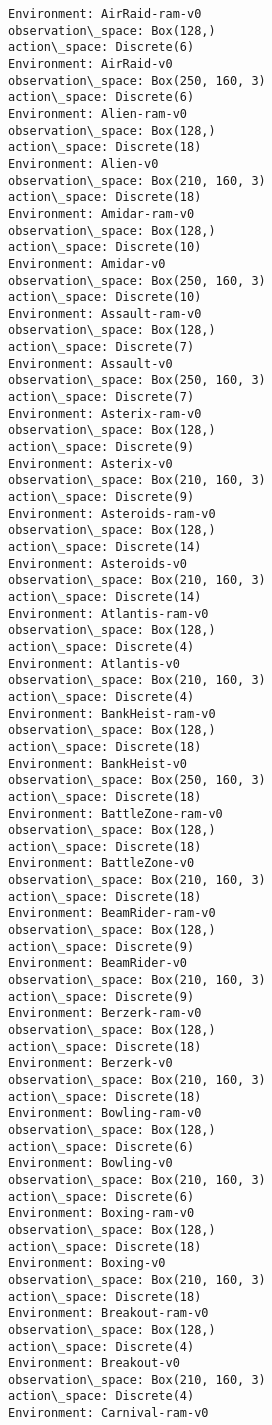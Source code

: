 \documentclass[11pt]{article}
\begin{document}
    \begin{Verbatim}[commandchars=\\\{\}]
Environment: AirRaid-ram-v0
observation\_space: Box(128,)
action\_space: Discrete(6)
Environment: AirRaid-v0
observation\_space: Box(250, 160, 3)
action\_space: Discrete(6)
Environment: Alien-ram-v0
observation\_space: Box(128,)
action\_space: Discrete(18)
Environment: Alien-v0
observation\_space: Box(210, 160, 3)
action\_space: Discrete(18)
Environment: Amidar-ram-v0
observation\_space: Box(128,)
action\_space: Discrete(10)
Environment: Amidar-v0
observation\_space: Box(250, 160, 3)
action\_space: Discrete(10)
Environment: Assault-ram-v0
observation\_space: Box(128,)
action\_space: Discrete(7)
Environment: Assault-v0
observation\_space: Box(250, 160, 3)
action\_space: Discrete(7)
Environment: Asterix-ram-v0
observation\_space: Box(128,)
action\_space: Discrete(9)
Environment: Asterix-v0
observation\_space: Box(210, 160, 3)
action\_space: Discrete(9)
Environment: Asteroids-ram-v0
observation\_space: Box(128,)
action\_space: Discrete(14)
Environment: Asteroids-v0
observation\_space: Box(210, 160, 3)
action\_space: Discrete(14)
Environment: Atlantis-ram-v0
observation\_space: Box(128,)
action\_space: Discrete(4)
Environment: Atlantis-v0
observation\_space: Box(210, 160, 3)
action\_space: Discrete(4)
Environment: BankHeist-ram-v0
observation\_space: Box(128,)
action\_space: Discrete(18)
Environment: BankHeist-v0
observation\_space: Box(250, 160, 3)
action\_space: Discrete(18)
Environment: BattleZone-ram-v0
observation\_space: Box(128,)
action\_space: Discrete(18)
Environment: BattleZone-v0
observation\_space: Box(210, 160, 3)
action\_space: Discrete(18)
Environment: BeamRider-ram-v0
observation\_space: Box(128,)
action\_space: Discrete(9)
Environment: BeamRider-v0
observation\_space: Box(210, 160, 3)
action\_space: Discrete(9)
Environment: Berzerk-ram-v0
observation\_space: Box(128,)
action\_space: Discrete(18)
Environment: Berzerk-v0
observation\_space: Box(210, 160, 3)
action\_space: Discrete(18)
Environment: Bowling-ram-v0
observation\_space: Box(128,)
action\_space: Discrete(6)
Environment: Bowling-v0
observation\_space: Box(210, 160, 3)
action\_space: Discrete(6)
Environment: Boxing-ram-v0
observation\_space: Box(128,)
action\_space: Discrete(18)
Environment: Boxing-v0
observation\_space: Box(210, 160, 3)
action\_space: Discrete(18)
Environment: Breakout-ram-v0
observation\_space: Box(128,)
action\_space: Discrete(4)
Environment: Breakout-v0
observation\_space: Box(210, 160, 3)
action\_space: Discrete(4)
Environment: Carnival-ram-v0

\end{Verbatim}
\end{document}
